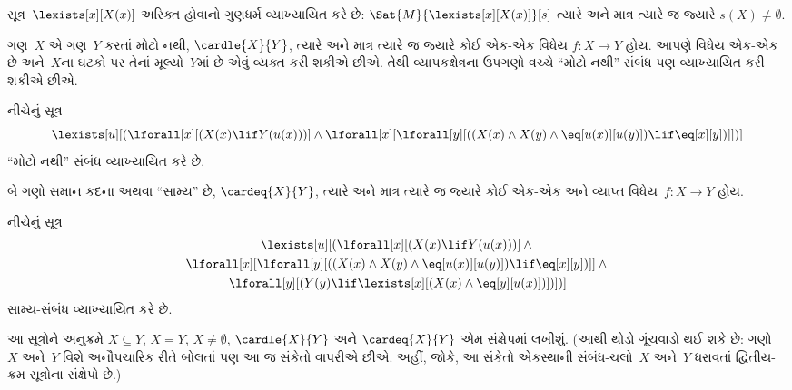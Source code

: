 \begin{prop}
સૂત્ર~$\lexists[x][X(x)]$ અરિક્ત હોવાનો ગુણધર્મ વ્યાખ્યાયિત
કરે છે: $\Sat{M}{\lexists[x][X(x)]}[s]$ ત્યારે અને માત્ર ત્યારે જ
જ્યારે $s(X) \neq \emptyset$.
\end{prop}

ગણ~$X$ એ ગણ~$Y$ કરતાં મોટો નથી, $\cardle{X}{Y}$, ત્યારે અને માત્ર
ત્યારે જ જ્યારે કોઈ એક-એક વિધેય $f\colon X \to Y$ હોય.
આપણે વિધેય એક-એક છે અને~$X$ના ઘટકો પર તેનાં મૂલ્યો~$Y$માં છે એવું
વ્યક્ત કરી શકીએ છીએ. તેથી વ્યાપકક્ષેત્રના ઉપગણો વચ્ચે ``મોટો નથી''
સંબંધ પણ વ્યાખ્યાયિત કરી શકીએ છીએ.

\begin{prop}
નીચેનું સૂત્ર
\[
\lexists[u][(\lforall[x][(X(x) \lif Y(u(x)))] \land \lforall[x][\lforall[y][((X(x) \land X(y) \land \eq[u(x)][u(y)]) \lif
      \eq[x][y])]])]
\]
``મોટો નથી'' સંબંધ વ્યાખ્યાયિત કરે છે.
\end{prop}

બે ગણો સમાન કદના અથવા ``સામ્ય'' છે, $\cardeq{X}{Y}$, ત્યારે અને
માત્ર ત્યારે જ જ્યારે કોઈ એક-એક અને વ્યાપ્ત વિધેય~$f\colon X \to Y$
હોય.

\begin{prop}
નીચેનું સૂત્ર
\begin{multline*}
  \lexists[u][(\lforall[x][(X(x) \lif Y(u(x)))] \land {}\\
    \lforall[x][\lforall[y][((X(x) \land X(y) \land \eq[u(x)][u(y)]) \lif \eq[x][y])]]
  \land {} \\\lforall[y][(Y(y) \lif \lexists[x][(X(x)
      \land \eq[y][u(x)])])])]
\end{multline*}
સામ્ય-સંબંધ વ્યાખ્યાયિત કરે છે.
\end{prop}

આ સૂત્રોને અનુક્રમે $X \subseteq Y$, $X = Y$, $X \neq
\emptyset$, $\cardle{X}{Y}$ અને $\cardeq{X}{Y}$ એમ સંક્ષેપમાં
લખીશું. (આથી થોડો ગૂંચવાડો થઈ શકે છે: ગણો~$X$ અને~$Y$ વિશે
અનૌપચારિક રીતે બોલતાં પણ આ જ સંકેતો વાપરીએ છીએ. અહીં, જોકે, આ
સંકેતો એકસ્થાની સંબંધ-ચલો~$X$ અને~$Y$ ધરાવતાં દ્વિતીય-ક્રમ
સૂત્રોના સંક્ષેપો છે.)

